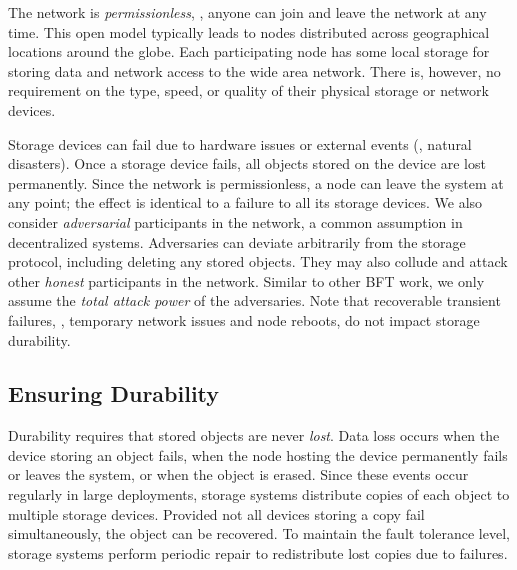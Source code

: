 The network is \emph{permissionless}, \ie, anyone can join and leave the network at any time.
This open model typically leads to nodes distributed across geographical locations around the globe.
Each participating node has some local storage for storing data and network access to the wide area network.
There is, however, no requirement on the type, speed, or quality of their physical storage or network devices.

Storage devices can fail due to hardware issues or external events (\eg, natural disasters).
Once a storage device fails, all objects stored on the device are lost permanently.
Since the network is permissionless, a node can leave the system at any point;
the effect is identical to a failure to all its storage devices.
We also consider \emph{adversarial} participants in the network, a common assumption in decentralized systems.
Adversaries can deviate arbitrarily from the storage protocol, including deleting any stored objects.
They may also collude and attack other \emph{honest} participants in the network.
Similar to other BFT work, we only assume the \emph{total attack power} of the adversaries.
Note that recoverable transient failures, \eg, temporary network issues and node reboots, do not impact storage durability.

\subsection{Ensuring Durability}
\label{sec:background:durability}

Durability requires that stored objects are never \emph{lost}.
Data loss occurs when the device storing an object fails, when the node hosting the device permanently fails or leaves the system, or when the object is erased.
Since these events occur regularly in large deployments, storage systems distribute copies of each object to multiple storage devices.
Provided not all devices storing a copy fail simultaneously, the object can be recovered.
To maintain the fault tolerance level, storage systems perform periodic repair to redistribute lost copies due to failures.

